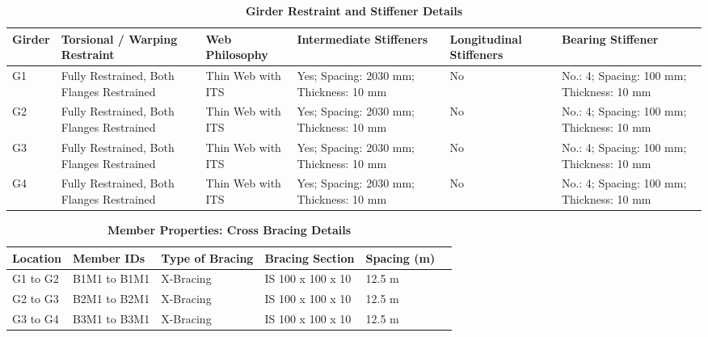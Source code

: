 \documentclass[12pt,a4paper]{report}
\numberwithin{table}{chapter}
\numberwithin{figure}{chapter}
\begin{document}
\vspace{4pt}
\begin{longtable}{|L{1.4cm}|p{2.2cm}|p{2.2cm}|p{3.0cm}|p{2.4cm}|p{2.2cm}|}
\caption{\textbf{Girder Restraint and Stiffener Details}}\\
\hline
\textbf{Girder} & \textbf{Torsional / Warping Restraint} & \textbf{Web Philosophy} & \textbf{Intermediate Stiffeners} & \textbf{Longitudinal Stiffeners} & \textbf{Bearing Stiffener} \\[6pt]
\hline
\endfirsthead
\endhead

G1 & Fully Restrained, Both Flanges Restrained & Thin Web with ITS & Yes; Spacing: 2030 mm; Thickness: 10 mm & No & No.: 4; Spacing: 100 mm; Thickness: 10 mm \\[8pt]
\hline
G2 & Fully Restrained, Both Flanges Restrained & Thin Web with ITS & Yes; Spacing: 2030 mm; Thickness: 10 mm & No & No.: 4; Spacing: 100 mm; Thickness: 10 mm \\[8pt]
\hline
G3 & Fully Restrained, Both Flanges Restrained & Thin Web with ITS & Yes; Spacing: 2030 mm; Thickness: 10 mm & No & No.: 4; Spacing: 100 mm; Thickness: 10 mm \\[8pt]
\hline
G4 & Fully Restrained, Both Flanges Restrained & Thin Web with ITS & Yes; Spacing: 2030 mm; Thickness: 10 mm & No & No.: 4; Spacing: 100 mm; Thickness: 10 mm \\[8pt]
\hline
\end{longtable}



\newpage

\vspace{0.4em}
\setlength{\tabcolsep}{4pt}
\setlength\LTleft{0pt}
\setlength\LTright{\fill}

\begin{longtable}{|L{2.2cm}|L{2.2cm}|L{3.0cm}|L{2.5cm}|C{1.8cm}|C{1.8cm}|}
\caption{\textbf{Member Properties: Cross Bracing Details}}
\hline
\textbf{Location} & \textbf{Member IDs} & \textbf{Type of Bracing} & \textbf{Bracing Section} & \textbf{Spacing (m)} \\
\hline
G1 to G2 & B1M1 to B1M1 & X-Bracing & IS 100 x 100 x 10 & 12.5 m \\[6pt]
\hline
G2 to G3 & B2M1 to B2M1 & X-Bracing & IS 100 x 100 x 10 & 12.5 m \\[6pt]
\hline
G3 to G4 & B3M1 to B3M1 & X-Bracing & IS 100 x 100 x 10 & 12.5 m \\[6pt]
\hline
\end{longtable}

\vspace{0.4em}
\noindent
\setlength{\tabcolsep}{4pt}
\setlength\LTleft{0pt}
\setlength\LTright{\fill}
\end{document}
